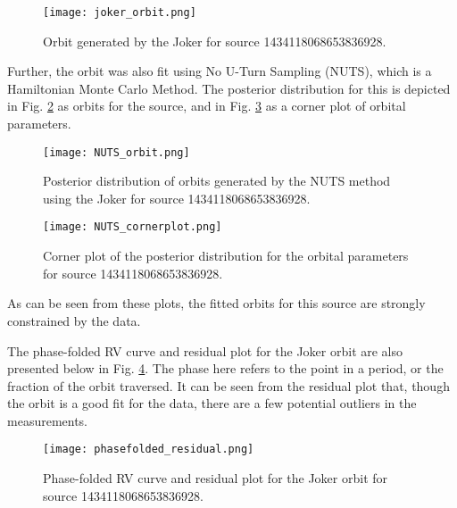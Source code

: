 \documentclass[12pt,a4paper]{article}
\begin{document}
\begin{figure}[htbp!]
\begin{center}
\texttt{[image: joker\_orbit.png]}
\end{center}
\caption{Orbit generated by the Joker for source 1434118068653836928.}
\label{fig:joker_orbit}
\end{figure}

Further, the orbit was also fit using No U-Turn Sampling (NUTS), which is a Hamiltonian Monte Carlo Method. The posterior distribution for this is depicted in Fig. \ref{fig:NUTS_orbit} as orbits for the source, and in Fig. \ref{fig:NUTS_cornerplot} as a corner plot of orbital parameters.

\begin{figure}[htbp!]
\begin{center}
\texttt{[image: NUTS\_orbit.png]}
\end{center}
\caption{Posterior distribution of orbits generated by the NUTS method using the Joker for source 1434118068653836928.}
\label{fig:NUTS_orbit}
\end{figure}

\begin{figure}[htbp!]
\begin{center}
\texttt{[image: NUTS\_cornerplot.png]}
\end{center}
\caption{Corner plot of the posterior distribution for the orbital parameters for source 1434118068653836928.}
\label{fig:NUTS_cornerplot}
\end{figure}

As can be seen from these plots, the fitted orbits for this source are strongly constrained by the data.

The phase-folded RV curve and residual plot for the Joker orbit are also presented below in Fig. \ref{fig:phasefolded_residual}. The phase here refers to the point in a period, or the fraction of the orbit traversed. It can be seen from the residual plot that, though the orbit is a good fit for the data, there are a few potential outliers in the measurements.

\begin{figure}[htbp!]
\begin{center}
\texttt{[image: phasefolded\_residual.png]}
\end{center}
\caption{Phase-folded RV curve and residual plot for the Joker orbit for source 1434118068653836928.}
\label{fig:phasefolded_residual}
\end{figure}
\end{document}
